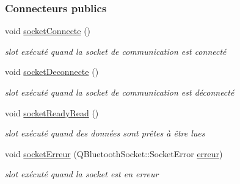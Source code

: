 \subsubsection*{Connecteurs publics}
\begin{DoxyCompactItemize}
\item 
void \hyperlink{class_peripherique_t_t_p_a_aab23a43f5c9d70c30df3dbf4aeeeff9d}{socket\+Connecte} ()
\begin{DoxyCompactList}\small\item\em slot exécuté quand la socket de communication est connecté \end{DoxyCompactList}\item 
void \hyperlink{class_peripherique_t_t_p_a_adb04c45864ea56a80a0716cde0a31856}{socket\+Deconnecte} ()
\begin{DoxyCompactList}\small\item\em slot exécuté quand la socket de communication est déconnecté \end{DoxyCompactList}\item 
void \hyperlink{class_peripherique_t_t_p_a_a4e1d676e59b293161a40ee6428a79871}{socket\+Ready\+Read} ()
\begin{DoxyCompactList}\small\item\em slot exécuté quand des données sont prêtes à être lues \end{DoxyCompactList}\item 
void \hyperlink{class_peripherique_t_t_p_a_a85811ace874ff7cea3437146511f1b2c}{socket\+Erreur} (Q\+Bluetooth\+Socket\+::\+Socket\+Error \hyperlink{class_peripherique_t_t_p_a_a7a31d9f923cc71a42d0dab80d9332eb6}{erreur})
\begin{DoxyCompactList}\small\item\em slot exécuté quand la socket est en erreur \end{DoxyCompactList}\end{DoxyCompactItemize}

